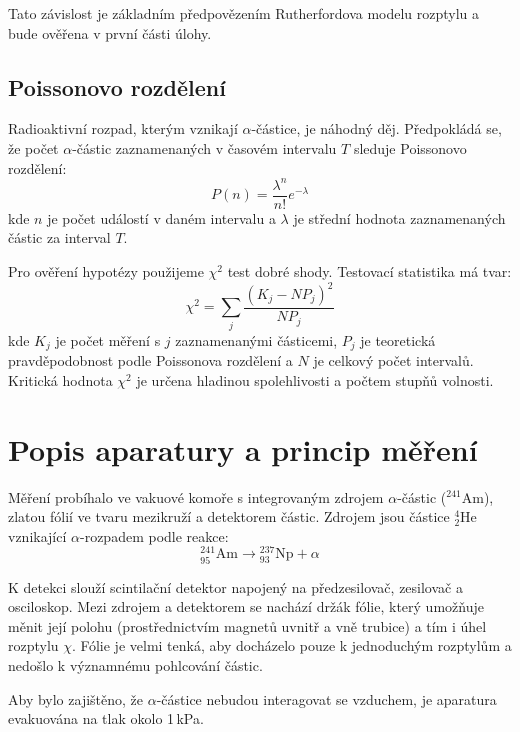\documentclass[czech,11pt,a4paper]{article}
\begin{document}
\begin{multicols}{2}
		Tato závislost je základním předpovězením Rutherfordova modelu rozptylu a bude ověřena v první části úlohy.
		
		\subsection*{Poissonovo rozdělení}
		
		Radioaktivní rozpad, kterým vznikají $\alpha$-částice, je náhodný děj. Předpokládá se, že počet $\alpha$-částic zaznamenaných v časovém intervalu $T$ sleduje Poissonovo rozdělení:
		\begin{equation}
			P(n) = \frac{\lambda^n}{n!} e^{-\lambda}
		\end{equation}
		kde $n$ je počet událostí v daném intervalu a $\lambda$ je střední hodnota zaznamenaných částic za interval $T$.
		
		Pro ověření hypotézy použijeme $\chi^2$ test dobré shody. Testovací statistika má tvar:
		\begin{equation}
			\chi^2 = \sum_j \frac{(K_j - N P_j)^2}{N P_j}
		\end{equation}
		kde $K_j$ je počet měření s $j$ zaznamenanými částicemi, $P_j$ je teoretická pravděpodobnost podle Poissonova rozdělení a $N$ je celkový počet intervalů. Kritická hodnota $\chi^2$ je určena hladinou spolehlivosti a počtem stupňů volnosti.
		\section{Popis aparatury a princip měření}
		
		Měření probíhalo ve vakuové komoře s integrovaným zdrojem $\alpha$-částic ($^{241}$Am), zlatou fólií ve tvaru mezikruží a detektorem částic. Zdrojem jsou částice $^4_2$He vznikající $\alpha$-rozpadem podle reakce:
		\begin{equation}
			^{241}_{95}\mathrm{Am} \rightarrow {}^{237}_{93}\mathrm{Np} + \alpha
		\end{equation}
		
		K detekci slouží scintilační detektor napojený na předzesilovač, zesilovač a osciloskop. Mezi zdrojem a detektorem se nachází držák fólie, který umožňuje měnit její polohu (prostřednictvím magnetů uvnitř a vně trubice) a tím i úhel rozptylu $\chi$. Fólie je velmi tenká, aby docházelo pouze k jednoduchým rozptylům a nedošlo k významnému pohlcování částic.
		
		Aby bylo zajištěno, že $\alpha$-částice nebudou interagovat se vzduchem, je aparatura evakuována na tlak okolo 1\,kPa. 
		

\end{multicols}
\end{document}
